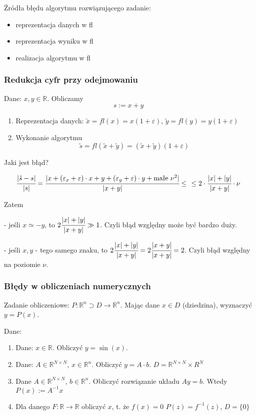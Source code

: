 \documentclass[hidelinks,a4paper]{article}
\newcommand{\RR}{\mathbb{R}}
\newcommand{\ra}{\rightarrow}
\begin{document}
Źródła błędu algorytmu rozwiązującego zadanie:
\begin{itemize}
	\item reprezentacja danych w fl
	\item reprezentacja wyniku w fl
	\item realizacja algorytmu w fl
\end{itemize}


\subsubsection{Redukcja cyfr przy odejmowaniu}

Dane: $x, y \in \RR$. Obliczamy
\[
	s := x + y
\]

\begin{enumerate}
	\item Reprezentacja danych: $\tilde{x} = fl(x) = x(1+\varepsilon)$,
	      $\tilde{y} = fl(y) = y(1 + \varepsilon)$
	\item Wykonanie algorytmu
	      \[
	      	\tilde{s} = fl(\tilde{x} + \tilde{y}) = (\tilde{x} + \tilde{y})(1 + \varepsilon)
	      \]
\end{enumerate}

Jaki jest błąd?

\[
	\cfrac{|\tilde{s} - s|}{|s|} = \cfrac{|x + (\varepsilon_x + \varepsilon)\cdot x + y + (\varepsilon_y + \varepsilon)\cdot y + \textrm{małe }\nu^2|}{|x + y|} \leq \cfrac{}{} \leq 2 \cdot \cfrac{|x|+|y|}{|x+y|} \cdot \nu
\]

Zatem

- jeśli $x \simeq -y$, to $2\cfrac{|x|+|y|}{|x+y|} \gg 1$. Czyli błąd względny może być bardzo duży.

- jeśli $x, y$ - tego samego znaku, to $2 \cfrac{|x|+|y|}{|x+y|} = 2 \cfrac{|x+y|}{|x+y|} = 2$. Czyli błąd względny na poziomie $\nu$.

\subsubsection{Błędy w obliczeniach numerycznych}

Zadanie obliczeniowe: $P: \RR^n \supset D \ra \RR^n$. Mając dane $x \in D$ (dziedzina), wyznaczyć $y = P(x)$.

Dane:

\begin{enumerate}
	\item Dane: $x \in \RR$. Obliczyć $y=\sin(x)$.
	\item Dane: $A \in \RR^{N \times N}$, $x \in \RR^n$. Obliczyć $y = A \cdot b$.
	      $D = \RR^{N \times N} \times R^N$
	\item Dane $A \in \RR^{N \times N}$, $b \in \RR^n$. Obliczyć rozwiązanie układu $Ay = b$. Wtedy $P(x) := A^{-1}x$
	\item Dla danego $F: \RR \ra \RR$ obliczyć $x$, t. że $f(x) = 0$
	      $P(z) = f^{-1}(z)$, $D = \{0\}$
\end{enumerate}
\end{document}
